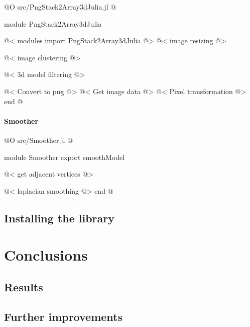 \documentclass[11pt,oneside]{article}	%
\begin{document}
@O src/PngStack2Array3dJulia.jl
@{module PngStack2Array3dJulia

@< modules import PngStack2Array3dJulia @>
@< image resizing @>

@< image clustering @>

@< 3d model filtering @>

@< Convert to png @>
@< Get image data @>
@< Pixel transformation @>
end
@}

\paragraph{Smoother}

@O src/Smoother.jl
@{module Smoother
export smoothModel

@< get adjacent vertices @>

@< laplacian smoothing @>
end
@}


\subsection{Installing the library}

\section{Conclusions}\label{sec:conclusions}
\subsection{Results}

\subsection{Further improvements}



\appendix
\end{document}
